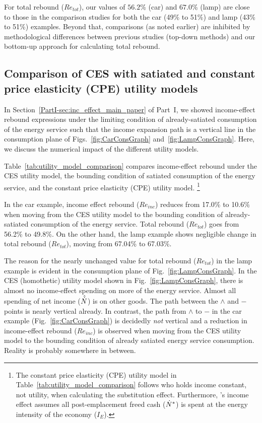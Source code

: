 \documentclass[12pt]{article}\usepackage[]{graphicx}\usepackage[]{xcolor}
\begin{document}
For total rebound ($Re_{tot}$),
our values of
$56.2$\% (car) and
$67.0$\% (lamp)
are close to those in the comparison studies for both the car (49\% to 51\%) and
lamp (43\% to 51\%) examples.
Beyond that, comparisons (as noted earlier) are inhibited
by methodological differences between previous studies (top-down methods)
and our bottom-up approach for calculating total rebound.


\subsection{Comparison of CES with satiated and
            constant price elasticity (CPE) utility models}
\label{sec:utility_comparison}







In Section~\ref{PartI-sec:inc_effect_main_paper} of Part~I,
we showed income-effect rebound expressions
under the limiting condition of already-satiated
consumption of the energy service such that the
income expansion path is a vertical line
in the consumption plane of
Figs.~\ref{fig:CarConsGraph} and~\ref{fig:LampConsGraph}.
Here, we discuss the numerical impact
of the different utility models.

Table~\ref{tab:utility_model_comparison}
compares income-effect rebound under the CES utility model,
the bounding condition of satiated consumption
of the energy service, and
the constant price elasticity (CPE) utility model.%
\footnote{
  The constant price elasticity (CPE) utility model 
  in Table~\ref{tab:utility_model_comparison}
  follows \citet{Borenstein:2015aa} who holds income constant, 
  not utility, 
  when calculating the substitution effect.
  Furthermore, \citeauthor{Borenstein:2015aa}'s income effect
  assumes all post-emplacement freed cash (${\dot{N}}^*$)
  is spent at the energy intensity of the economy ($I_E$).
}

In the car example, income effect rebound ($Re_{inc}$)
reduces from 17.0\% to
10.6\% when moving from the
CES utility model to the bounding condition of already-satiated
consumption of the energy service.
Total rebound ($Re_{tot}$) goes from
56.2\% to
49.8\%.
On the other hand,
the lamp example shows negligible change
in total rebound ($Re_{tot}$),
moving
from 67.04\%
to 67.03\%.

The reason for the nearly unchanged value
for total rebound ($Re_{tot}$)
in the lamp example is evident in the consumption plane
of Fig.~\ref{fig:LampConsGraph}.
In the CES (homothetic) utility model
shown in Fig.~\ref{fig:LampConsGraph},
there is almost no income-effect spending
on more of the energy service.
Almost all spending of net income ($\hat{\dot{N}}$)
is on other goods.
The path between the $\wedge$ and $-$ points
is nearly vertical already.
In contrast, the path from $\wedge$ to $-$ in the car example
(Fig.~\ref{fig:CarConsGraph})
is decidedly \emph{not} vertical and a reduction in
income-effect rebound ($Re_{inc}$) is observed when
moving from the CES utility model to the bounding condition
of already satiated energy service consumption.
Reality is probably somewhere in between.
\end{document}
